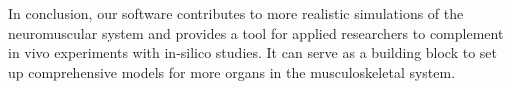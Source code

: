 In conclusion, our software contributes to more realistic simulations of the neuromuscular system and provides a tool for applied researchers to complement in vivo experiments with in-silico studies. It can serve as a building block to set up comprehensive models for more organs in the musculoskeletal system.


